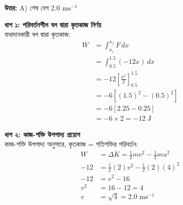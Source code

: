 \documentclass[12pt, a4paper]{article}
\begin{document}
\vspace{0.5em}
\begin{tcolorbox}[answerbox]
    \textbf{\color{success} উত্তর:} A) শেষ বেগ $2.0\text{ ms}^{-1}$
\end{tcolorbox}
\vspace{1em}

\begin{tcolorbox}[solutionbox={সমাধান (Solution)}]
    \noindent
    \textbf{ধাপ ১: পরিবর্তনশীল বল দ্বারা কৃতকাজ নির্ণয়} \\
    বাধাদানকারী বল দ্বারা কৃতকাজ:
    \begin{align*}
        W &= \int_{x_i}^{x_f} F \, dx \\
          &= \int_{0.5}^{1.5} (-12x) \, dx \\
          &= -12 \left[ \frac{x^2}{2} \right]_{0.5}^{1.5} \\
          &= -6 \left[ (1.5)^2 - (0.5)^2 \right] \\
          &= -6 [2.25 - 0.25] \\
          &= -6 \times 2 = -12\text{ J}
    \end{align*}
    
    \vspace{0.5em}
    \noindent\textbf{ধাপ ২: কাজ-শক্তি উপপাদ্য প্রয়োগ} \\
    কাজ-শক্তি উপপাদ্য অনুসারে, কৃতকাজ = গতিশক্তির পরিবর্তন:
    \begin{align*}
        W &= \Delta K = \frac{1}{2} m v^2 - \frac{1}{2} m u^2 \\
        -12 &= \frac{1}{2} (2) v^2 - \frac{1}{2} (2) (4)^2 \\
        -12 &= v^2 - 16 \\
        v^2 &= 16 - 12 = 4 \\
        v &= \sqrt{4} = \mathbf{2.0}\text{ ms}^{-1}
    \end{align*}
\end{tcolorbox}

\newpage
\end{document}
